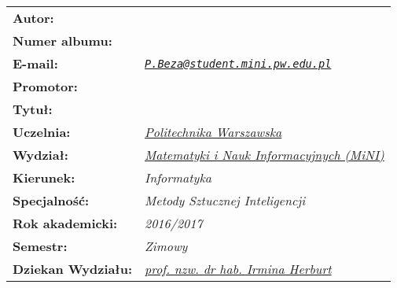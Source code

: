 \makeatletter
{
	\renewcommand{\arraystretch}{3.0}
	\vspace*{\fill}
	\begin{table}[h]
	\centering
	\begin{tabular}{>{\bfseries}l>{\itshape}l}
		Autor:            & \href{mailto:P.Beza@student.mini.pw.edu.pl}{\@author}\\
		Numer albumu:     & \@album\\
		E-mail:           & \texttt{\href{mailto:P.Beza@student.mini.pw.edu.pl}{P.Beza@student.mini.pw.edu.pl}}\\
		Promotor:         & \@supervisor\\
		Tytuł:            & \parbox{6.5cm}{\@title}\\
		Uczelnia:         & \href{https://www.pw.edu.pl/}{Politechnika Warszawska}\\
		Wydział:          & \href{http://www.mini.pw.edu.pl/}{Matematyki i Nauk Informacyjnych (MiNI)}\\
		Kierunek:         & Informatyka\\
		Specjalność:      & Metody Sztucznej Inteligencji\\
		Rok akademicki:   & 2016/2017\\
		Semestr:          & Zimowy\\
		Dziekan Wydziału: & \href{mailto:I.Herburt@mini.pw.edu.pl}{prof. nzw. dr hab. Irmina Herburt}\\
	\end{tabular}
	\end{table}
	\vspace*{\fill}
}
\makeatother
